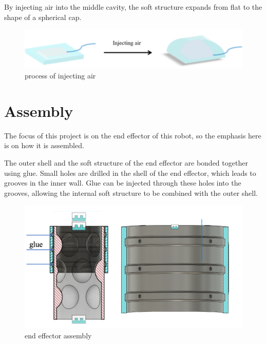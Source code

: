 \documentclass[10pt, a4paper, twocolumn]{article}
\begin{document}
By injecting air into the middle cavity, the soft structure expands from flat to the shape of a spherical cap.

\begin{figure}
    \centering
    \includegraphics[width=0.8\linewidth]{process of injecting air.png}
    \caption{process of injecting air}
    \label{fig:process of injecting air}
\end{figure}

\section{Assembly}
The focus of this project is on the end effector of this robot, so the emphasis here is on how it is assembled.

The outer shell and the soft structure of the end effector are bonded together using glue. Small holes are drilled in the shell of the end effector, which leads to grooves in the inner wall. Glue can be injected through these holes into the grooves, allowing the internal soft structure to be combined with the outer shell.

\begin{figure}
    \centering
    \includegraphics[width=0.8\linewidth]{end effector assembly.png}
    \caption{end effector assembly}
    \label{fig:end effector assembly}
\end{figure}



\end{document}
